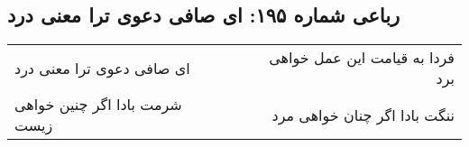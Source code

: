 \begin{center}
\section*{رباعی شماره ۱۹۵: ای صافی دعوی ترا معنی درد}
\label{sec:sh195}
\begin{longtable}{l p{0.5cm} r}
ای صافی دعوی ترا معنی درد
&&
فردا به قیامت این عمل خواهی برد
\\
شرمت بادا اگر چنین خواهی زیست
&&
ننگت بادا اگر چنان خواهی مرد
\\
\end{longtable}
\end{center}

